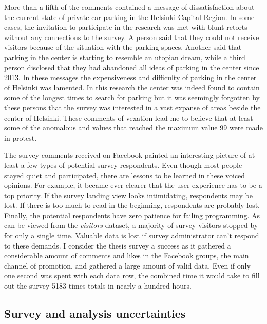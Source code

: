 More than a fifth of the comments contained a message of dissatisfaction about the current state of private car parking in the Helsinki Capital Region. In some cases, the invitation to participate in the research was met with blunt retorts without any connections to the survey. A person said that they could not receive visitors because of the situation with the parking spaces. Another said that parking in the center is starting to resemble an utopian dream, while a third person disclosed that they had abandoned all ideas of parking in the center since 2013. In these messages the expensiveness and difficulty of parking in the center of Helsinki was lamented. In this research the center was indeed found to contain some of the longest times to search for parking but it was seemingly forgotten by these persons that the survey was interested in a vast expanse of areas beside the center of Helsinki. These comments of vexation lead me to believe that at least some of the anomalous  and  values that reached the maximum value 99 were made in protest.

The survey comments received on Facebook painted an interesting picture of at least a few types of potential survey respondents. Even though most people stayed quiet and participated, there are lessons to be learned in these voiced opinions. For example, it became ever clearer that the user experience has to be a top priority. If the survey landing view looks intimidating, respondents may be lost. If there is too much to read in the beginning, respondents are probably lost. Finally, the potential respondents have zero patience for failing programming. As can be viewed from the \textit{visitors} dataset, a majority of survey visitors stopped by for only a single time. Valuable data is lost if survey administrator can't respond to these demands. I consider the thesis survey a success as it gathered a considerable amount of comments and likes in the Facebook groups, the main channel of promotion, and gathered a large amount of valid data. Even if only one second was spent with each data row, the combined time it would take to fill out the survey 5183 times totals in nearly a hundred hours.

\newpage
\subsection{Survey and analysis uncertainties}
\justify


